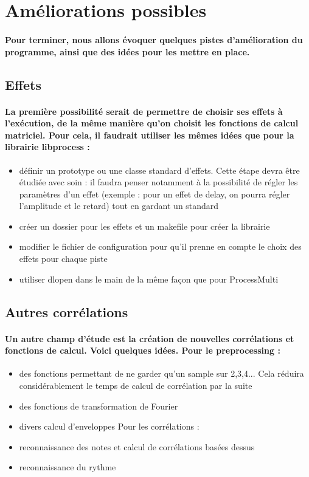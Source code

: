 \documentclass[a4paper]{article}
\begin{document}
\section{Améliorations possibles} \paragraph{Pour terminer, nous allons évoquer
quelques pistes d’amélioration du programme, ainsi que des idées pour les mettre
en place.}

\subsection{Effets} \paragraph{La première possibilité serait de permettre de
choisir ses effets à l’exécution, de la même manière qu’on choisit les fonctions
de calcul matriciel. Pour cela, il faudrait utiliser les mêmes idées que pour la
librairie libprocess :}

\begin{itemize} \item définir un prototype ou une classe standard d’effets.
Cette étape devra être étudiée avec soin : il faudra penser notamment à la
possibilité de régler les paramètres d’un effet (exemple : pour un effet de
delay, on pourra régler l’amplitude et le retard) tout en gardant un standard
\item créer un dossier pour les effets et un makefile pour créer la librairie
\item modifier le fichier de configuration pour qu’il prenne en compte le choix
des effets pour chaque piste \item utiliser dlopen dans le main de la même façon
que pour ProcessMulti \end{itemize}

\subsection{Autres corrélations} \paragraph{Un autre champ d’étude est la
création de nouvelles corrélations et fonctions de calcul. Voici quelques idées.
Pour le preprocessing :}

\begin{itemize} \item des fonctions permettant de ne garder qu’un sample sur
2,3,4... Cela réduira considérablement le temps de calcul de corrélation par la
suite \item des fonctions de transformation de Fourier \item divers calcul
d’enveloppes Pour les corrélations : \item reconnaissance des notes et calcul de
corrélations basées dessus \item reconnaissance du rythme \end{itemize}
\end{document}
